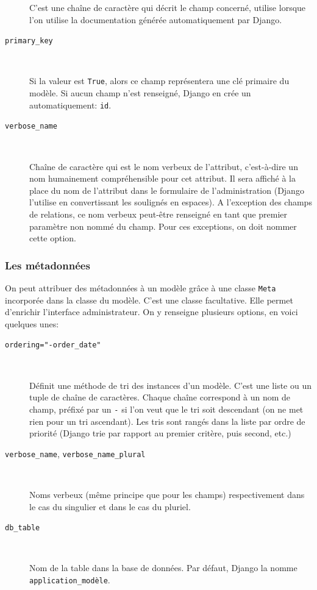\documentclass[a4paper, 10pt]{article}
\begin{document}
\begin{description}
          C'est une chaîne de caractère qui décrit le champ concerné, utilise lorsque l'on utilise la documentation générée automatiquement par Django.

    \item[\texttt{primary_key}]~

          Si la valeur est \texttt{True}, alors ce champ représentera une clé primaire du modèle. Si aucun champ n'est renseigné, Django en crée un automatiquement: \texttt{id}.

    \item[\texttt{verbose_name}]~

          Chaîne de caractère qui est le \og nom verbeux \fg{} de l'attribut, c'est-à-dire un nom humainement compréhensible pour cet attribut. Il sera affiché à la place du nom de l'attribut dans le formulaire de l'administration (Django l'utilise en convertissant les soulignés en espaces). A l'exception des champs de relations, ce nom verbeux peut-être renseigné en tant que premier paramètre non nommé du champ. Pour ces exceptions, on doit nommer cette option.
\end{description}

\subsubsection{Les métadonnées}
On  peut attribuer des métadonnées à un modèle grâce à une classe \texttt{Meta} incorporée dans la classe du modèle. C'est une classe facultative. Elle permet d'enrichir l'interface administrateur. On y renseigne plusieurs options, en voici quelques unes:
\begin{description}
    \item[\texttt{ordering="-order_date"}]~

          Définit une méthode de tri des instances d'un modèle. C'est une liste ou un tuple de chaîne de caractères. Chaque chaîne correspond à un nom de champ, préfixé par un \texttt{-} si l'on veut que le tri soit descendant (on ne met rien pour un tri ascendant). Les tris sont rangés dans la liste par ordre de priorité (Django trie par rapport au premier critère, puis second, etc.)

    \item[\texttt{verbose_name}, \texttt{verbose_name_plural}]~

          Noms verbeux (même principe que pour les champs) respectivement dans le cas du singulier et dans le cas du pluriel.
          
          \item[\texttt{db_table}]~
          
          Nom de la table dans la base de données. Par défaut, Django la nomme \texttt{application_modèle}.
        \end{description}
        
\end{document}
